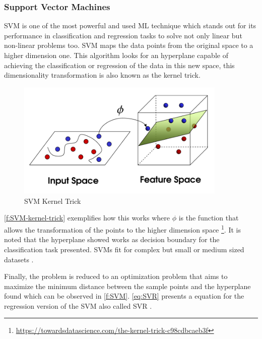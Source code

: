 

\subsubsection{Support Vector Machines}

\ac{SVM} is one of the most powerful and used \ac{ML} technique which stands out for its performance in classification and regression tasks to solve not only linear but non-linear problems too. \ac{SVM} maps the data points from the original space to a higher dimension one. This algorithm looks for an hyperplane capable of achieving the classification or regression of the data in this new space, this dimensionality transformation is also known as the kernel trick\cite{Batta2020}.

\begin{figure}[h]
\centering
\includegraphics[width=10cm]{figures/Ch2/SVM-KernelTrick.png}
\caption{SVM Kernel Trick}
\label{f:SVM-kernel-trick}
\end{figure}

\autoref{f:SVM-kernel-trick} exemplifies how this works where \begin{math}\phi\end{math} is the function that allows the transformation of the points to the higher dimension space \footnote{\url{https://towardsdatascience.com/the-kernel-trick-c98cdbcaeb3f}}. It is noted that the hyperplane showed works as decision boundary for the classification task presented. \ac{SVM}s fit for complex but small or medium sized datasets \cite{geron2017}.
 
Finally, the problem is reduced to an optimization problem that aims to maximize the minimum distance between the sample points and the hyperplane found which can be observed in \autoref{f:SVM}. \autoref{eq:SVR} presents a equation for the regression version of the \ac{SVM} also called \ac{SVR} \cite{Ye2020}. 

